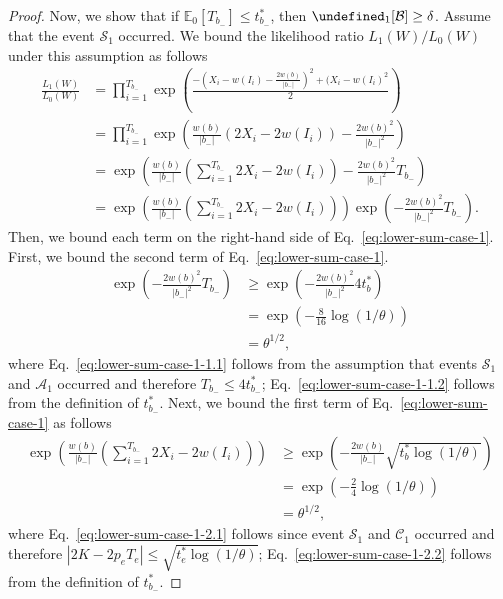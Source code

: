 \documentclass{article}
\newcommand{\E}{\mathbb E}
\let\Pr\undefined
\DeclareMathOperator{\Pr}{Pr}
\begin{document}
\begin{proof}
Now, we show that if $\E_0[T_{b_-}] \le t_{b_-}^*$, then $\Pr_1[\mathcal B] \ge \delta$.
Assume that the event $\mathcal S_1$ occurred.
We bound the likelihood ratio $L_1(W)/L_0(W)$ under this assumption as follows
\begin{align}
  \frac{L_1(W)}{L_0(W)} 
  &= \prod_{i=1}^{T_{b_-}}
  \exp\left(\frac{-\left(X_i-w(I_i)-\frac{2w(b)}{|b_-|}\right)^2+(X_i-w(I_i)^2}{2}\right) \nonumber \\
  &= \prod_{i=1}^{T_{b_-}}
  \exp\left(\frac{w(b)}{|b_-|}(2X_i-2w(I_i))-\frac{2w(b)^2}{|b_-|^2}\right) \nonumber \\
  &= \exp\left(\frac{w(b)}{|b_-|}\left(\sum_{i=1}^{T_{b_-}}2X_i-2w(I_i)\right)-\frac{2w(b)^2}{|b_-|^2}T_{b_-}\right) \nonumber \\
  &= \exp\left(\frac{w(b)}{|b_-|}\left(\sum_{i=1}^{T_{b_-}}2X_i-2w(I_i)\right)\right)\exp\left(-\frac{2w(b)^2}{|b_-|^2}T_{b_-}\right) \label{eq:lower-sum-case-1}.
\end{align}
Then, we bound each term on the right-hand side of Eq.~\eqref{eq:lower-sum-case-1}.
First, we bound the second term of Eq.~\eqref{eq:lower-sum-case-1}.
\begin{align}
	\exp\left(-\frac{2w(b)^2}{|b_-|^2} T_{b_-}\right) 
	 &\ge \exp\left(-\frac{2w(b)^2}{|b_-|^2} 4t_b^*\right) \label{eq:lower-sum-case-1-1.1} \\
     &=\exp\left(-\frac{8}{16}\log(1/\theta)\right) \label{eq:lower-sum-case-1-1.2}\\
     &= \theta^{1/2}\label{eq:lower-sum-case-1-1.3},
\end{align}
where Eq.~\eqref{eq:lower-sum-case-1-1.1} follows from the assumption that events $\mathcal S_1$ and $\mathcal A_1$ occurred and therefore $T_{b_-} \le 4t_{b_-}^*$; 
Eq.~\eqref{eq:lower-sum-case-1-1.2} follows from the definition of $t_{b_-}^*$.
Next, we bound the first term of Eq.~\eqref{eq:lower-sum-case-1} as follows
\begin{align}
	\exp\left(\frac{w(b)}{|b_-|}\left(\sum_{i=1}^{T_{b_-}}2X_i-2w(I_i)\right)\right)
	&\ge \exp\left(-\frac{2w(b)}{|b_-|}\sqrt{t_b^*\log(1/\theta)}\right) \label{eq:lower-sum-case-1-2.1}\\
    & = \exp\left(-\frac{2}{4}\log(1/\theta)\right) \label{eq:lower-sum-case-1-2.2}\\
    &=\theta^{1/2},  \label{eq:lower-sum-case-1-2.3}
\end{align}
where Eq.~\eqref{eq:lower-sum-case-1-2.1} follows since event $\mathcal S_1$ and $\mathcal C_1$ occurred and therefore $|2K-2p_eT_e| \le \sqrt{t_e^*\log(1/\theta)}$; 
Eq.~\eqref{eq:lower-sum-case-1-2.2} follows from the definition of $t_{b_-}^*$.


\end{proof}
\end{document}
